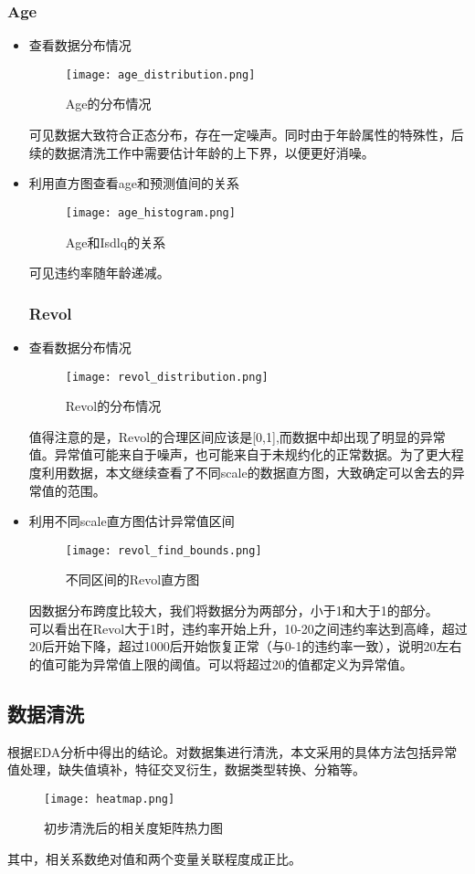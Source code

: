 \subsubsection{Age}
\begin{itemize}
	\item 查看数据分布情况
	      \begin{figure}[H]
		      \centering
		      \texttt{[image: age\_distribution.png]}
		      \caption{Age的分布情况}
	      \end{figure}
	      可见数据大致符合正态分布，存在一定噪声。同时由于年龄属性的特殊性，后续的数据清洗工作中需要估计年龄的上下界，以便更好消噪。
	\item 利用直方图查看age和预测值间的关系
	      \begin{figure}[H]
		      \centering
		      \texttt{[image: age\_histogram.png]}
		      \caption{Age和Isdlq的关系}
	      \end{figure}
	      可见违约率随年龄递减。
	      \subsubsection{Revol}
	\item 查看数据分布情况
	      \begin{figure}[H]
		      \centering
		      \texttt{[image: revol\_distribution.png]}
		      \caption{Revol的分布情况}
		      \label{fig:rd}
	      \end{figure}
	      值得注意的是，Revol的合理区间应该是[0,1],而数据中却出现了明显的异常值。异常值可能来自于噪声，也可能来自于未规约化的正常数据。为了更大程度利用数据，本文继续查看了不同scale的数据直方图，大致确定可以舍去的异常值的范围。
	\item 利用不同scale直方图估计异常值区间
	      \begin{figure}[H]
		      \centering
		      \texttt{[image: revol\_find\_bounds.png]}
		      \caption{不同区间的Revol直方图}
		      \label{fig:rh}
	      \end{figure}
	      因数据分布跨度比较大，我们将数据分为两部分，小于1和大于1的部分。\\
	      可以看出在Revol大于1时，违约率开始上升，10-20之间违约率达到高峰，超过20后开始下降，超过1000后开始恢复正常（与0-1的违约率一致），说明20左右的值可能为异常值上限的阈值。可以将超过20的值都定义为异常值。     
\end{itemize}

\subsection{数据清洗}
根据EDA分析中得出的结论。对数据集进行清洗，本文采用的具体方法包括异常值处理，缺失值填补，特征交叉衍生，数据类型转换、分箱等。
\begin{figure}[H]
	\centering
	\texttt{[image: heatmap.png]}
	\caption{初步清洗后的相关度矩阵热力图}
	\label{fig:hm}
\end{figure}
其中，相关系数绝对值和两个变量关联程度成正比。

